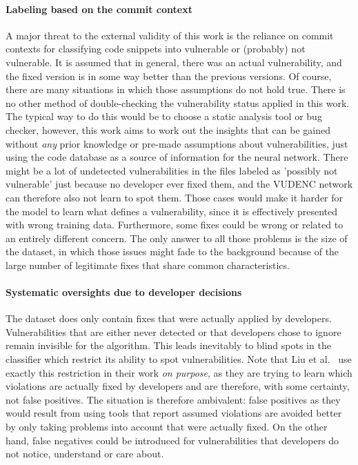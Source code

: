 \documentclass[
a4paper,
pagesize,
pdftex,
12pt,
ngerman,
fleqn,
final,
]{scrartcl}
\begin{document}
	\paragraph{Labeling based on the commit context}
	A major threat to the external validity of this work is the reliance on commit contexts for classifying code snippets into vulnerable or (probably) not vulnerable. It is assumed that in general, there was an actual vulnerability, and the fixed version is in some way better than the previous versions. Of course, there are many situations in which those assumptions do not hold true. There is no other method of double-checking the vulnerability status applied in this work. The typical way to do this would be to choose a static analysis tool or bug checker, however, this work aims to work out the insights that can be gained without \textit{any} prior knowledge or pre-made assumptions about vulnerabilities, just using the code database as a source of information for the neural network. There might be a lot of undetected vulnerabilities in the files labeled as 'possibly not vulnerable' just because no developer ever fixed them, and the VUDENC network can therefore also not learn to spot them. Those cases would make it harder for the model to learn what defines a vulnerability, since it is effectively presented with wrong training data. Furthermore, some fixes could be wrong or related to an entirely different concern. The only answer to all those problems is the size of the dataset, in which those issues might fade to the background because of the large number of legitimate fixes that share common characteristics.\\
	\paragraph{Systematic oversights due to developer decisions}
	The dataset does only contain fixes that were actually applied by developers. Vulnerabilities that are either never detected or that developers chose to ignore remain invisible for the algorithm. This leads inevitably to blind spots in the classifier which restrict its ability to spot vulnerabilities. Note that Liu et al.~\cite{Liu.2018} use exactly this restriction in their work \textit{on purpose}, as they are trying to learn which violations are actually fixed by developers and are therefore, with some certainty, not false positives. The situation is therefore ambivalent: false positives as they would result from using tools that report assumed violations are avoided better by only taking problems into account that were actually fixed. On the other hand, false negatives could be introduced for vulnerabilities that developers do not notice, understand or care about.
\end{document}
